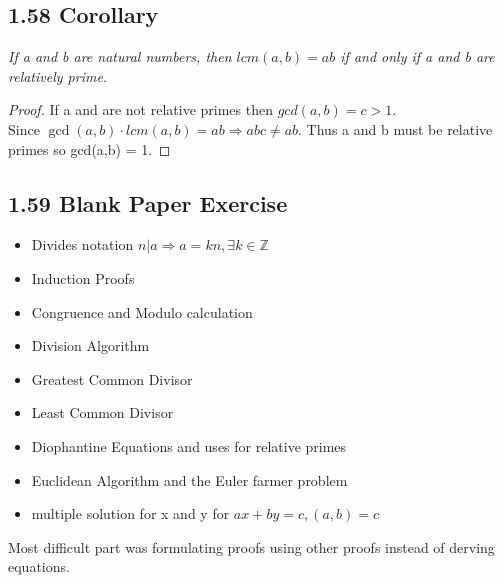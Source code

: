 \documentclass{article}
\begin{document}
\subsection*{1.58 Corollary} 
\quad \textit{If a and b are natural numbers, then $lcm(a,b) = ab$ if and only if a and b are relatively prime.}

\begin{proof}
If a and are not relative primes then $gcd(a,b) = c > 1$.\\
Since $\gcd(a,b) \cdot lcm(a,b) = ab \Rightarrow abc \neq ab$. Thus a and b must be relative primes so gcd(a,b) = 1.
\end{proof}

\subsection*{1.59 Blank Paper Exercise} 

\begin{itemize}
    \item Divides notation $n \vert a \Rightarrow a = kn, \exists k \in \mathbb{Z}$
    \item Induction Proofs
    \item Congruence and Modulo calculation
    \item Division Algorithm
    \item Greatest Common Divisor
    \item Least Common Divisor
    \item Diophantine Equations and uses for relative primes
    \item Euclidean Algorithm and the Euler farmer problem
    \item multiple solution for x and y for $ax+by=c, (a,b)=c$
\end{itemize}
Most difficult part was formulating proofs using other proofs instead of derving equations.
\end{document}
